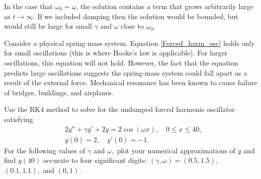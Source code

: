 In the case that $\omega_0 = \omega$, the solution contains a term that grows arbitrarily large as $t \to \infty$.
If we included damping then the solution would be bounded, but would still be large for small $\gamma$ and $\omega$ close to $\omega_0$.

Consider a physical spring-mass system.
Equation \ref{Forced_harm_osc} holds only for small oscillations (this is where Hooke's law is applicable).
For larger oscillations, this equation will not hold.
However, the fact that the equation predicts large oscillations suggests the spring-mass system could fall apart as a result of the external force. 
Mechanical resonance has been known to cause failure of bridges, buildings, and airplanes.

\begin{problem}
Use the RK4 method to solve for the undamped forced harmonic oscillator satisfying 
\begin{align*}
&{}2y'' + \gamma y' + 2y = 2 \cos (\omega x), \quad 0 \leq x \leq 40,\\
&{}y(0) = 2, \quad
y'(0) = -1.
\end{align*}
For the following values of $\gamma$ and $\omega,$ plot your numerical approximations of $y$ and find $y(40)$ accurate to four significant digits: $(\gamma, \omega) = (0.5, 1.5),$ $(0.1, 1.1),$ and $(0, 1).$
\end{problem}

